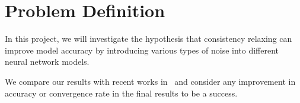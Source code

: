 \section{Problem Definition}
\label{sec:problem}


In this project, we will investigate the hypothesis that consistency
relaxing can improve model accuracy by introducing various types of noise
into different neural network models.



We compare our results with recent works in~\cite{chilimbi14adam,
wan2013dropconnect, goodfellow13maxout, dean2012large} and consider any
improvement in accuracy or convergence rate in the final results to be a
success.


